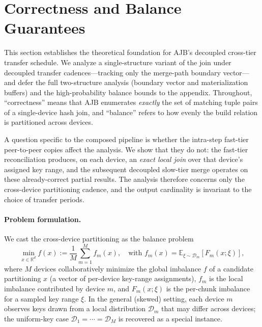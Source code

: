 \documentclass{article}
\begin{document}
\section{Correctness and Balance Guarantees}
\label{sec:convergence}

This section establishes the theoretical foundation for AJB's decoupled
cross-tier transfer schedule. We analyze a single-structure variant of the join
under decoupled transfer cadences---tracking only the merge-path boundary
vector---and defer the full two-structure analysis (boundary vector and
materialization buffers) and the high-probability balance bounds to the
appendix. Throughout, ``correctness'' means that AJB enumerates \emph{exactly}
the set of matching tuple pairs of a single-device hash join, and
``balance'' refers to how evenly the build relation is partitioned across
devices.

A question specific to the composed pipeline is whether the
intra-step fast-tier peer-to-peer copies affect the analysis. We show that they
do not: the fast-tier reconciliation produces, on each device, an \emph{exact
local join} over that device's assigned key range, and the subsequent decoupled
slow-tier merge operates on these already-correct partial results. The analysis
therefore concerns only the cross-device partitioning cadence, and the output
cardinality is invariant to the choice of transfer periods.

\paragraph{Problem formulation.}
We cast the cross-device partitioning as the balance problem
\begin{equation}
\min_{x \in \mathbb{R}^d} f(x) := \frac{1}{M} \sum_{m=1}^{M} f_m(x),
\quad \text{with } f_m(x) = \mathbb{E}_{\xi \sim \mathcal{D}_m}[F_m(x; \xi)],
\label{eq:objective}
\end{equation}
where $M$ devices collaboratively minimize the global imbalance $f$ of a
candidate partitioning $x$ (a vector of per-device key-range assignments),
$f_m$ is the local imbalance contributed by device $m$, and $F_m(x;\xi)$ is the
per-chunk imbalance for a sampled key range $\xi$. In the general (skewed)
setting, each device $m$ observes keys drawn from a local distribution
$\mathcal{D}_m$ that may differ across devices; the uniform-key case
$\mathcal{D}_1 = \cdots = \mathcal{D}_M$ is recovered as a special instance.
\end{document}
